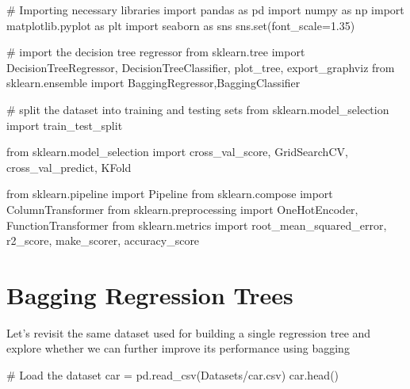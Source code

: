 \documentclass[
  letterpaper,
  DIV=11,
  numbers=noendperiod]{scrreprt}
\newenvironment{Shaded}{\begin{snugshade}}{\end{snugshade}}
\newcommand{\BuiltInTok}[1]{\textcolor[rgb]{0.00,0.23,0.31}{#1}}
\newcommand{\CommentTok}[1]{\textcolor[rgb]{0.37,0.37,0.37}{#1}}
\newcommand{\FloatTok}[1]{\textcolor[rgb]{0.68,0.00,0.00}{#1}}
\newcommand{\ImportTok}[1]{\textcolor[rgb]{0.00,0.46,0.62}{#1}}
\newcommand{\NormalTok}[1]{\textcolor[rgb]{0.00,0.23,0.31}{#1}}
\newcommand{\OperatorTok}[1]{\textcolor[rgb]{0.37,0.37,0.37}{#1}}
\newcommand{\StringTok}[1]{\textcolor[rgb]{0.13,0.47,0.30}{#1}}
\begin{document}
\begin{Shaded}
\begin{Highlighting}[]
\CommentTok{\# Importing necessary libraries}
\ImportTok{import}\NormalTok{ pandas }\ImportTok{as}\NormalTok{ pd}
\ImportTok{import}\NormalTok{ numpy }\ImportTok{as}\NormalTok{ np}
\ImportTok{import}\NormalTok{ matplotlib.pyplot }\ImportTok{as}\NormalTok{ plt}
\ImportTok{import}\NormalTok{ seaborn }\ImportTok{as}\NormalTok{ sns}
\NormalTok{sns.}\BuiltInTok{set}\NormalTok{(font\_scale}\OperatorTok{=}\FloatTok{1.35}\NormalTok{)}

\CommentTok{\# import the decision tree regressor}
\ImportTok{from}\NormalTok{ sklearn.tree }\ImportTok{import}\NormalTok{ DecisionTreeRegressor, DecisionTreeClassifier, plot\_tree, export\_graphviz}
\ImportTok{from}\NormalTok{ sklearn.ensemble }\ImportTok{import}\NormalTok{ BaggingRegressor,BaggingClassifier}

\CommentTok{\# split the dataset into training and testing sets}
\ImportTok{from}\NormalTok{ sklearn.model\_selection }\ImportTok{import}\NormalTok{ train\_test\_split}


\ImportTok{from}\NormalTok{ sklearn.model\_selection }\ImportTok{import}\NormalTok{ cross\_val\_score, GridSearchCV, cross\_val\_predict, KFold}

\ImportTok{from}\NormalTok{ sklearn.pipeline }\ImportTok{import}\NormalTok{ Pipeline}
\ImportTok{from}\NormalTok{ sklearn.compose }\ImportTok{import}\NormalTok{ ColumnTransformer}
\ImportTok{from}\NormalTok{ sklearn.preprocessing }\ImportTok{import}\NormalTok{ OneHotEncoder, FunctionTransformer}
\ImportTok{from}\NormalTok{ sklearn.metrics }\ImportTok{import}\NormalTok{ root\_mean\_squared\_error, r2\_score, make\_scorer, accuracy\_score}
\end{Highlighting}
\end{Shaded}

\section{Bagging Regression Trees}\label{bagging-regression-trees}

Let's revisit the same dataset used for building a single regression
tree and explore whether we can further improve its performance using
bagging

\begin{Shaded}
\begin{Highlighting}[]
\CommentTok{\# Load the dataset}
\NormalTok{car }\OperatorTok{=}\NormalTok{ pd.read\_csv(}\StringTok{\textquotesingle{}Datasets/car.csv\textquotesingle{}}\NormalTok{)}
\NormalTok{car.head()}
\end{Highlighting}
\end{Shaded}
\end{document}
